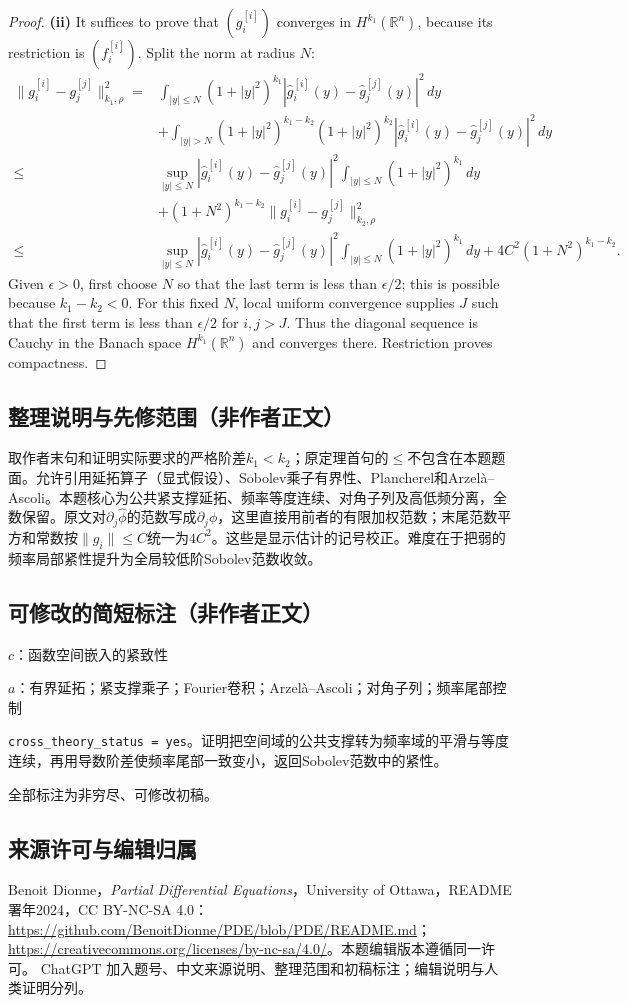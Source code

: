 \documentclass[UTF8,11pt]{ctexart}
\theoremstyle{definition}
\begin{document}
\begin{proof}
\textbf{(ii)} It suffices to prove that $(g_i^{[i]})$ converges in
$H^{k_1}(\mathbb R^n)$, because its restriction is $(f_i^{[i]})$.
Split the norm at radius $N$:
\begin{align*}
\|g_i^{[i]}-g_j^{[j]}\|_{k_1,\rho}^2
={}&\int_{|y|\leq N}(1+|y|^2)^{k_1}
 |\widehat g_i^{[i]}(y)-\widehat g_j^{[j]}(y)|^2\,dy\\
&+\int_{|y|>N}(1+|y|^2)^{k_1-k_2}(1+|y|^2)^{k_2}
 |\widehat g_i^{[i]}(y)-\widehat g_j^{[j]}(y)|^2\,dy\\
\leq{}&\sup_{|y|\leq N}|\widehat g_i^{[i]}(y)-\widehat g_j^{[j]}(y)|^2
 \int_{|y|\leq N}(1+|y|^2)^{k_1}\,dy\\
&+(1+N^2)^{k_1-k_2}\|g_i^{[i]}-g_j^{[j]}\|_{k_2,\rho}^2\\
\leq{}&\sup_{|y|\leq N}|\widehat g_i^{[i]}(y)-\widehat g_j^{[j]}(y)|^2
 \int_{|y|\leq N}(1+|y|^2)^{k_1}\,dy
 +4C^2(1+N^2)^{k_1-k_2}.
\end{align*}
Given $\epsilon>0$, first choose $N$ so that the last term is less
than $\epsilon/2$; this is possible because $k_1-k_2<0$.
For this fixed $N$, local uniform convergence supplies $J$ such that
the first term is less than $\epsilon/2$ for $i,j>J$.
Thus the diagonal sequence is Cauchy in the Banach space
$H^{k_1}(\mathbb R^n)$ and converges there. Restriction proves compactness.
\end{proof}

\subsection*{整理说明与先修范围（非作者正文）}
取作者末句和证明实际要求的严格阶差$k_1<k_2$；原定理首句的$\leq$不包含在本题题面。允许引用延拓算子（显式假设）、Sobolev乘子有界性、Plancherel和Arzel\`a--Ascoli。本题核心为公共紧支撑延拓、频率等度连续、对角子列及高低频分离，全数保留。原文对$\partial_j\widehat\phi$的范数写成$\partial_j\phi$，这里直接用前者的有限加权范数；末尾范数平方和常数按$\|g_i\|\leq C$统一为$4C^2$。这些是显示估计的记号校正。难度在于把弱的频率局部紧性提升为全局较低阶Sobolev范数收敛。
\subsection*{可修改的简短标注（非作者正文）}
$c$：函数空间嵌入的紧致性

$a$：有界延拓；紧支撑乘子；Fourier卷积；Arzelà--Ascoli；对角子列；频率尾部控制

\texttt{cross\_theory\_status = yes}。证明把空间域的公共支撑转为频率域的平滑与等度连续，再用导数阶差使频率尾部一致变小，返回Sobolev范数中的紧性。

全部标注为非穷尽、可修改初稿。
\subsection*{来源许可与编辑归属}
Benoit Dionne，\emph{Partial Differential Equations}，University of Ottawa，README署年2024，CC BY-NC-SA 4.0：\url{https://github.com/BenoitDionne/PDE/blob/PDE/README.md}；\url{https://creativecommons.org/licenses/by-nc-sa/4.0/}。本题编辑版本遵循同一许可。
ChatGPT 加入题号、中文来源说明、整理范围和初稿标注；编辑说明与人类证明分列。
\end{document}
